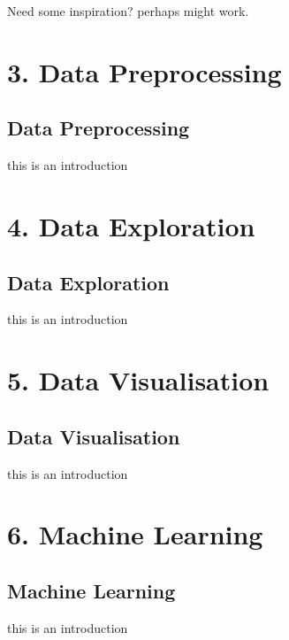 \documentclass[letterpaper,10pt,english]{jupyterBook}
\begin{document}
\sphinxAtStartPar
Need some inspiration? perhaps  might work.


\part{3. Data Preprocessing}


\chapter{Data Preprocessing}
\label{\detokenize{c3_data_preprocessing/introduction:data-preprocessing}}\label{\detokenize{c3_data_preprocessing/introduction::doc}}
\sphinxAtStartPar
this is an introduction


\part{4. Data Exploration}


\chapter{Data Exploration}
\label{\detokenize{c4_data_exploration/introduction:data-exploration}}\label{\detokenize{c4_data_exploration/introduction::doc}}
\sphinxAtStartPar
this is an introduction


\part{5. Data Visualisation}


\chapter{Data Visualisation}
\label{\detokenize{c5_data_visualisation/introduction:data-visualisation}}\label{\detokenize{c5_data_visualisation/introduction::doc}}
\sphinxAtStartPar
this is an introduction


\part{6. Machine Learning}


\chapter{Machine Learning}
\label{\detokenize{c6_machine_learning/introduction:machine-learning}}\label{\detokenize{c6_machine_learning/introduction::doc}}
\sphinxAtStartPar
this is an introduction







\renewcommand{\indexname}{Index}
\printindex
\end{document}
